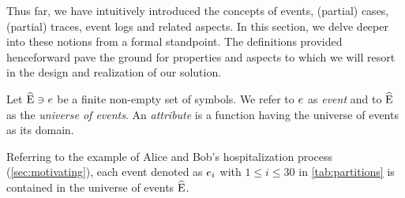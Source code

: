 \begin{newj}
Thus far, we have intuitively introduced the concepts of events, (partial) cases, (partial) traces, event logs and related aspects.
In this section, we delve deeper into these notions from a formal standpoint. The definitions provided henceforward pave the ground for properties and aspects to which we will resort in the design and realization of our solution.

\begin{definition}[Event]\label{def:evt}
	Let $\widehat{\mathrm{E}} \ni e$ be a finite non-empty set of symbols. We refer to $e$ as \emph{event} and to $\widehat{\mathrm{E}}$ as the \emph{universe of events}.
	An \emph{attribute} is a function having the universe of events as its domain.
\end{definition}
%
Referring to the example of Alice and Bob's hospitalization process (\cref{sec:motivating}), each event denoted as $e_i$ with $1 \leq i \leq 30$ in \cref{tab:partitions} is contained in the universe of events $\widehat{\mathrm{E}}$. 


\end{newj}
